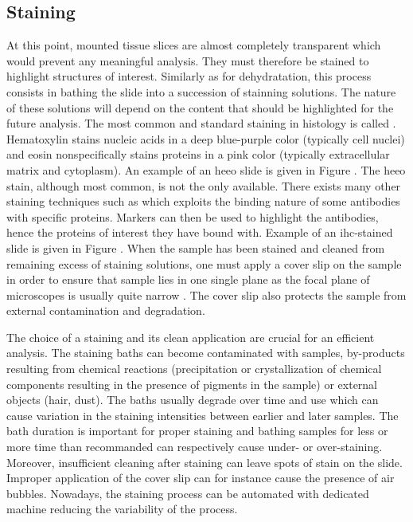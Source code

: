 \subsection{Staining}
\label{ssec:backdp:staining}
At this point, mounted tissue slices are almost completely transparent which would prevent any meaningful analysis. They must therefore be stained to highlight structures of interest. Similarly as for dehydratation, this process consists in bathing the slide into a succession of stainning solutions. The nature of these solutions will depend on the content that should be highlighted for the future analysis. The most common and standard staining in histology is called . Hematoxylin stains nucleic acids in a deep blue-purple color (typically cell nuclei) and eosin nonspecifically stains proteins in a pink color (typically extracellular matrix and cytoplasm). An example of an \acrshort{heeo} slide is given in Figure . The \acrshort{heeo} stain, although most common, is not the only available. There exists many other staining techniques such as  which exploits the binding nature of some antibodies with specific proteins. Markers can then be used to highlight the antibodies, hence the proteins of interest they have bound with. Example of an \acrshort{ihc}-stained slide is given in Figure . When the sample has been stained and cleaned from remaining excess of staining solutions, one must apply a cover slip on the sample in order to ensure that sample lies in one single plane as the focal plane of microscopes is usually quite narrow . The cover slip also protects the sample from external contamination and degradation. 

The choice of a staining and its clean application are crucial for an efficient analysis. The staining baths can become contaminated with samples, by-products resulting from chemical reactions (\eg precipitation or crystallization of chemical components resulting in the presence of pigments in the sample) or external objects (\eg hair, dust). The baths usually degrade over time and use which can cause variation in the staining intensities between earlier and later samples. The bath duration is important for proper staining and bathing samples for less or more time than recommanded can respectively cause under- or over-staining. Moreover, insufficient cleaning after staining can leave spots of stain on the slide. Improper application of the cover slip can for instance cause the presence of air bubbles. Nowadays, the staining process can be automated with dedicated machine reducing the variability of the process. 


